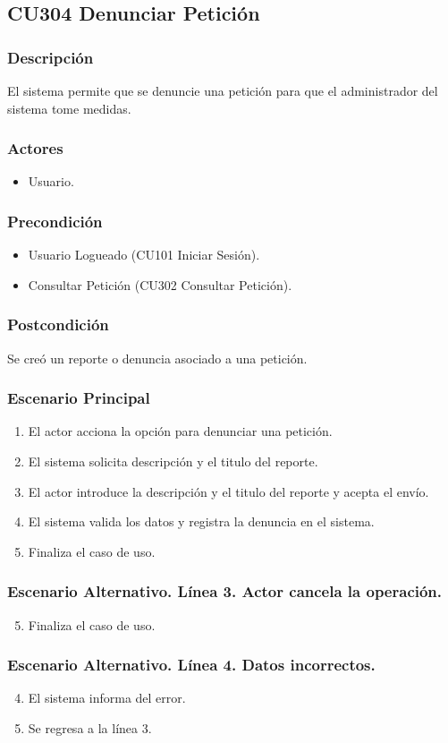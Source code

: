 \subsection{CU304 Denunciar Petici\'{o}n}
\subsubsection{Descripci\'{o}n}
El sistema permite que se denuncie una petici\'{o}n para que el administrador del sistema tome medidas.
\subsubsection{Actores}
\begin{itemize}
\item Usuario.
\end{itemize}
\subsubsection{Precondici\'{o}n}
\begin{itemize}
\item Usuario Logueado (CU101 Iniciar Sesi\'{o}n).
\item Consultar Petici\'{o}n (CU302 Consultar Petici\'{o}n).
\end{itemize}
\subsubsection{Postcondici\'{o}n}
Se cre\'{o} un reporte o denuncia asociado a una petici\'{o}n.
\subsubsection{Escenario Principal}
\begin{enumerate}
\item El actor acciona la opci\'{o}n para denunciar una petici\'{o}n.
\item El sistema solicita descripci\'{o}n y el titulo del reporte.
\item El actor introduce la descripci\'{o}n y el titulo del reporte y acepta el env\'{i}o.
\item El sistema valida los datos y registra la denuncia en el sistema.
\item Finaliza el caso de uso.
\end{enumerate}
\subsubsection{Escenario Alternativo. L\'{i}nea 3. Actor cancela la operaci\'{o}n.}
\begin{enumerate}
\setcounter{enumi}{4}
\item Finaliza el caso de uso.
\end{enumerate}
\subsubsection{Escenario Alternativo. L\'{i}nea 4. Datos incorrectos.}
\begin{enumerate}
\setcounter{enumi}{3}
\item El sistema informa del error.
\item Se regresa a la l\'{i}nea 3.
\end{enumerate}